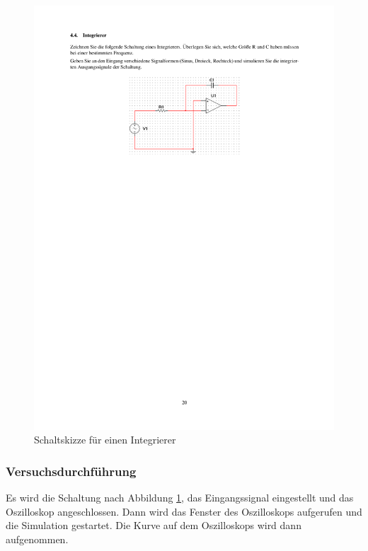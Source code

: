 \documentclass[12pt,a4paper]{article}
\begin{document}
\begin{figure}[H] 
  \centering
    \includegraphics[trim = 10mm 180mm 10mm 50mm, clip, scale = 1]{ep5_14[Page20].pdf}
  	\caption[Schaltskizze für einen Integrierer]{Schaltskizze für einen Integrierer\footnotemark}
  \label{fig:4_a_4}
\end{figure}

\subsubsection{Versuchsdurchführung}

Es wird die Schaltung nach Abbildung \ref{fig:4_a_4}, das Eingangssignal eingestellt und das Oszilloskop angeschlossen. Dann wird das Fenster des Oszilloskops aufgerufen und die Simulation gestartet. Die Kurve auf dem Oszilloskops wird dann aufgenommen.
\end{document}
